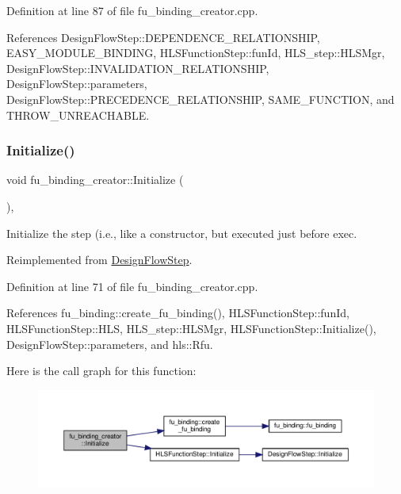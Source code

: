 Definition at line 87 of file fu\+\_\+binding\+\_\+creator.\+cpp.



References Design\+Flow\+Step\+::\+D\+E\+P\+E\+N\+D\+E\+N\+C\+E\+\_\+\+R\+E\+L\+A\+T\+I\+O\+N\+S\+H\+IP, E\+A\+S\+Y\+\_\+\+M\+O\+D\+U\+L\+E\+\_\+\+B\+I\+N\+D\+I\+NG, H\+L\+S\+Function\+Step\+::fun\+Id, H\+L\+S\+\_\+step\+::\+H\+L\+S\+Mgr, Design\+Flow\+Step\+::\+I\+N\+V\+A\+L\+I\+D\+A\+T\+I\+O\+N\+\_\+\+R\+E\+L\+A\+T\+I\+O\+N\+S\+H\+IP, Design\+Flow\+Step\+::parameters, Design\+Flow\+Step\+::\+P\+R\+E\+C\+E\+D\+E\+N\+C\+E\+\_\+\+R\+E\+L\+A\+T\+I\+O\+N\+S\+H\+IP, S\+A\+M\+E\+\_\+\+F\+U\+N\+C\+T\+I\+ON, and T\+H\+R\+O\+W\+\_\+\+U\+N\+R\+E\+A\+C\+H\+A\+B\+LE.

\mbox{\label{classfu__binding__creator_a4a4645ca4839bcf172824e2c725f4219}} 
\subsubsection{\texorpdfstring{Initialize()}{Initialize()}}
{\footnotesize\ttfamily void fu\+\_\+binding\+\_\+creator\+::\+Initialize (\begin{DoxyParamCaption}{ }\end{DoxyParamCaption})\hspace{0.3cm}{\ttfamily [override]}, {\ttfamily [virtual]}}



Initialize the step (i.\+e., like a constructor, but executed just before exec. 



Reimplemented from \hyperlink{classDesignFlowStep_a44b50683382a094976e1d432a7784799}{Design\+Flow\+Step}.



Definition at line 71 of file fu\+\_\+binding\+\_\+creator.\+cpp.



References fu\+\_\+binding\+::create\+\_\+fu\+\_\+binding(), H\+L\+S\+Function\+Step\+::fun\+Id, H\+L\+S\+Function\+Step\+::\+H\+LS, H\+L\+S\+\_\+step\+::\+H\+L\+S\+Mgr, H\+L\+S\+Function\+Step\+::\+Initialize(), Design\+Flow\+Step\+::parameters, and hls\+::\+Rfu.

Here is the call graph for this function\+:
\nopagebreak
\begin{figure}[H]
\begin{center}
\leavevmode
\includegraphics[width=350pt]{d8/df2/classfu__binding__creator_a4a4645ca4839bcf172824e2c725f4219_cgraph}
\end{center}
\end{figure}


